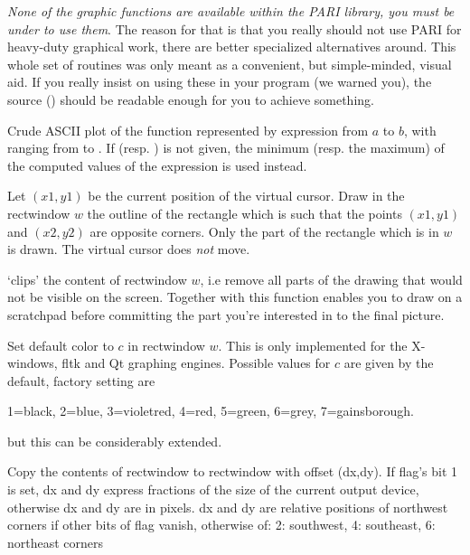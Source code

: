  \emph{None of the graphic functions are available
within the PARI library, you must be under  to use them}. The reason
for that is that you really should not use PARI for heavy-duty graphical work,
there are better specialized alternatives around. This whole set of routines
was only meant as a convenient, but simple-minded, visual aid. If you really
insist on using these in your program (we warned you), the source
() should be readable enough for you to achieve something.


\label{se:plot}
Crude ASCII plot of the function represented by expression 
from $a$ to $b$, with  ranging from  to . If
 (resp. ) is not given, the minimum (resp. the maximum)
of the computed values of the expression is used instead.

\label{se:plotbox}
Let $(x1,y1)$ be the current position of the virtual cursor. Draw in the
rectwindow $w$ the outline of the rectangle which is such that the points
$(x1,y1)$ and $(x2,y2)$ are opposite corners. Only the part of the rectangle
which is in $w$ is drawn. The virtual cursor does \emph{not} move.

\label{se:plotclip}
`clips' the content of rectwindow $w$, i.e remove all parts of the
drawing that would not be visible on the screen. Together with
 this function enables you to draw on a scratchpad before
committing the part you're interested in to the final picture.

\label{se:plotcolor}
Set default color to $c$ in rectwindow $w$.
This is only implemented for the X-windows, fltk and Qt graphing engines.
Possible values for $c$ are given by the  default,
factory setting are

1=black, 2=blue, 3=violetred, 4=red, 5=green, 6=grey, 7=gainsborough.

but this can be considerably extended.

\label{se:plotcopy}
Copy the contents of rectwindow  to rectwindow 
with offset (dx,dy). If flag's bit 1 is set, dx and dy express fractions of
the size of the current output device, otherwise dx and dy are in pixels. dx
and dy are relative positions of northwest corners if other bits of flag
vanish, otherwise of: 2: southwest, 4: southeast, 6: northeast corners

